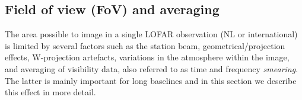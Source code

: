 \documentclass[graybox]{svmult}
\begin{document}
%

\subsection{Field of view (FoV) and averaging}\label{sec:fov}

The area possible to image in a single LOFAR observation (NL or international)
is limited by several factors such as the station beam, geometrical/projection
effects, W-projection artefacts, variations in the atmosphere within the image,
and averaging of visibility data, also referred to as time and frequency
\emph{smearing}. The latter is mainly important for long baselines and in this
section we describe this effect in more detail. 
\end{document}
